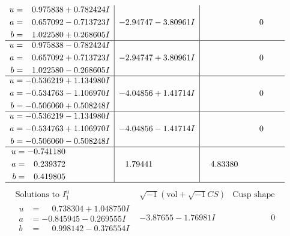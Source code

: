 \documentclass[1p]{elsarticle_modified}
\theoremstyle{definition}
\newcommand{\I}{\sqrt{-1}}
\begin{document}
$$\begin{array}{c|c|c}
\begin{aligned}
u &= \phantom{-}0.975838 + 0.782424 I \\
a &= \phantom{-}0.657092 - 0.713723 I \\
b &= \phantom{-}1.022580 + 0.268605 I\end{aligned}
 & -2.94747 - 3.80961 I & \phantom{-0.000000 } 0 \\ \hline\begin{aligned}
u &= \phantom{-}0.975838 - 0.782424 I \\
a &= \phantom{-}0.657092 + 0.713723 I \\
b &= \phantom{-}1.022580 - 0.268605 I\end{aligned}
 & -2.94747 + 3.80961 I & \phantom{-0.000000 } 0 \\ \hline\begin{aligned}
u &= -0.536219 + 1.134980 I \\
a &= -0.534763 - 1.106970 I \\
b &= -0.506060 + 0.508248 I\end{aligned}
 & -4.04856 + 1.41714 I & \phantom{-0.000000 } 0 \\ \hline\begin{aligned}
u &= -0.536219 - 1.134980 I \\
a &= -0.534763 + 1.106970 I \\
b &= -0.506060 - 0.508248 I\end{aligned}
 & -4.04856 - 1.41714 I & \phantom{-0.000000 } 0 \\ \hline\begin{aligned}
u &= -0.741180\phantom{ +0.000000I} \\
a &= \phantom{-}0.239372\phantom{ +0.000000I} \\
b &= \phantom{-}0.419805\phantom{ +0.000000I}\end{aligned}
 & \phantom{-}1.79441\phantom{ +0.000000I} & \phantom{-}4.83380\phantom{ +0.000000I}\\
 \hline 
 \end{array}$$\newpage$$\begin{array}{c|c|c}  
\text{Solutions to }I^u_{1}& \I (\text{vol} + \sqrt{-1}CS) & \text{Cusp shape}\\
 \hline 
\begin{aligned}
u &= \phantom{-}0.738304 + 1.048750 I \\
a &= -0.845945 - 0.269555 I \\
b &= \phantom{-}0.998142 - 0.376554 I\end{aligned}
 & -3.87655 - 1.76981 I & \phantom{-0.000000 } 0 \\ \hline\begin{aligned}

\end{aligned}
\end{array}$$
\end{document}
